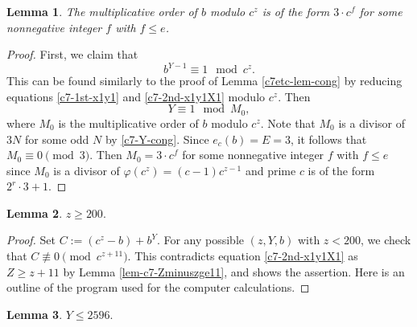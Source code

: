 \documentclass[11pt]{amsart}
\newtheorem{lem}{Lemma}[section]
\numberwithin{equation}{section}
\begin{document}
\begin{lem}\label{lem-c7-ordczb}
The multiplicative order of $b$ modulo $c^z$ is of the form $3 \cdot c^f$ for some nonnegative integer $f$ with $f \le e$.
\end{lem}

\begin{proof}
First, we claim that
\[
b^{Y-1} \equiv 1 \mod{c^z}.
\]
This can be found similarly to the proof of Lemma \ref{c7etc-lem-cong} by reducing equations \eqref{c7-1st-x1y1} and \eqref{c7-2nd-x1y1X1} modulo $c^z$.
Then
\[
Y \equiv 1 \mod M_0,
\]
where $M_0$ is the multiplicative order of $b$ modulo $c^z$.
Note that $M_0$ is a divisor of $3N$ for some odd $N$ by \eqref{c7-Y-cong}.
Since $e_{c}(b)=E=3$, it follows that $M_0 \equiv 0 \pmod{3}$.
Then $M_0 = 3 \cdot c^f$ for some nonnegative integer $f$ with $f \le e$ since $M_0$ is a divisor of $\varphi(c^z)=(c-1)c^{z-1}$ and prime $c$ is of the form $2^r \cdot 3+1$.  
\end{proof}

\begin{lem}\label{lem-c7-zge200}
$z \ge 200.$
\end{lem}

\begin{proof}
Set $C:=(c^z-b)+b^Y$.
For any possible $(z,Y,b)$ with $z<200$, we check that $C \not\equiv 0 \pmod{c^{z+11}}$.
This contradicts equation \eqref{c7-2nd-x1y1X1} as $Z \ge z+11$ by Lemma \ref{lem-c7-Zminuszge11}, and shows the assertion.
Here is an outline of the program used for the computer calculations. 


\end{proof}

\begin{lem}\label{lem-c7-Yge2596}
$Y \le 2596.$
\end{lem}
\end{document}
